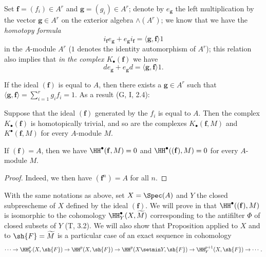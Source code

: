 \begin{env}[1.1.7]
\label{III.1.1.7}
Set $\mathbf{f}=(f_i)\in A^r$ and $\mathbf{g}=(g_i)\in A^r$; denote by $e_\mathbf{g}$ the left multiplication by the vector $\mathbf{g}\in A^r$ on the exterior algebra $\wedge(A^r)$; we know that we have the \emph{homotopy formula}
\[
  i_\mathbf{f}e_\mathbf{g}+e_\mathbf{g}i_\mathbf{f}=\langle\mathbf{g},\mathbf{f}\rangle 1
  \tag{1.1.7.1}
\]
in the $A$-module $A^r$ ($1$ denotes the identity automorphism of $A^r$); this relation also implies that \emph{in the complex $K_\bullet(\mathbf{f})$} we have
\[
  de_\mathbf{g}+e_\mathbf{g}d=\langle\mathbf{g},\mathbf{f}\rangle 1.
  \tag{1.1.7.2}
\]

If the ideal $(\mathbf{f})$ is equal to $A$, then there exists a $\mathbf{g}\in A^r$ such that $\langle\mathbf{g},\mathbf{f}\rangle=\sum_{i=1}^r g_i f_i=1$.
As a result (G, I, 2.4):
\end{env}

\begin{proposition}[1.1.8]
\label{III.1.1.8}
Suppose that the ideal $(\mathbf{f})$ generated by the $f_i$ is equal to $A$.
Then the complex $K_\bullet(\mathbf{f})$ is homotopically trivial, and so are the complexes $K_\bullet(\mathbf{f},M)$ and $K^\bullet(\mathbf{f},M)$ for every $A$-module $M$.
\end{proposition}

\begin{corollary}[1.1.9]
\label{III.1.1.9}
If $(\mathbf{f})=A$, then we have $\HH^\bullet(\mathbf{f},M)=0$ and $\HH^\bullet((\mathbf{f}),M)=0$ for every $A$-module $M$.
\end{corollary}

\begin{proof}
Indeed, we then have $(\mathbf{f}^n)=A$ for all $n$.
\end{proof}

\begin{remark}[1.1.10]
\label{III.1.1.10}
With the same notations as above, set $X=\Spec(A)$ and $Y$ the closed subprescheme of $X$ defined by the ideal $(\mathbf{f})$.
We will prove in  that $\HH^\bullet((\mathbf{f}),M)$ is isomorphic to the cohomology $\HH_Y^\bullet(X,\widetilde{M})$ corresponding to the antifilter $\Phi$ of closed subsets of $Y$ (T, 3.2).
We will also show that Proposition  applied to $X$ and to $\sh{F}=\widetilde{M}$ is a particular case of an exact sequence in cohomology
\[
  \cdots\to\HH_Y^p(X,\sh{F})\to\HH^p(X,\sh{F})\to\HH^p(X\setmin Y,\sh{F})\to\HH_Y^{p+1}(X,\sh{F})\to\cdots.
\]
\end{remark}

